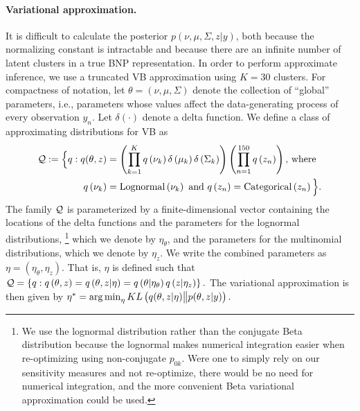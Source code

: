 %
\paragraph{Variational approximation.} It is difficult to calculate the
posterior $p\left(\nu, \mu, \Sigma, z \vert y\right)$, both because the
normalizing constant is intractable and because there are an infinite number of
latent clusters in a true BNP representation. In order to perform approximate
inference, we use a truncated VB approximation using $K=30$
clusters\citep{blei:2006:dirichletbnp}. For compactness of notation, let $\theta =
\left(\nu, \mu, \Sigma\right)$ denote the collection of ``global'' parameters,
i.e., parameters whose values affect the data-generating process of every
observation $y_n$.   Let $\delta\left(\cdot\right)$ denote a delta function. We
define a class of approximating distributions for VB as
%
\begin{align*}
\mathcal{Q} := \Big\{ q:
q(\theta, z) &=
\left(\prod_{k=1}^{K}q\left(\nu_{k}\right)\delta\left(\mu_{k}\right)
    \delta\left(\Sigma_{k}\right)\right)
    \left(\prod_{n=1}^{150}q\left(z_{n}\right) \right)\textrm{, where } \\
q\left(\nu_{k}\right) &= \mathrm{Lognormal}\left(\nu_k\right) \textrm{ and }
q\left(z_n\right) = \mathrm{Categorical}\left(z_n\right)
\Big\}.
\end{align*}
%
The family $\mathcal{Q}$ is parameterized by a finite-dimensional vector containing
the locations of the delta functions and the parameters for the lognormal
distributions,
%
\footnote{We use the lognormal distribution rather than the conjugate Beta
distribution because the lognormal makes numerical integration easier when
re-optimizing using non-conjugate $p_{0k}$.  Were one to simply rely on our
sensitivity measures and not re-optimize, there would be no need for numerical
integration, and the more convenient Beta variational approximation could be
used.}
%
which we denote by $\eta_\theta$, and the parameters for the
multinomial distributions, which we denote by $\eta_z$. We write the combined
parameters as $\eta=\left(\eta_\theta, \eta_z\right)$. That is, $\eta$ is
defined such that
%
$\mathcal{Q} =
    \left\{q: q\left(\theta, z\right) =
            q\left(\theta, z \vert \eta \right) =
            q\left(\theta \vert \eta_\theta \right)
            q\left(z \vert \eta_z \right)
    \right\}.$
%
The variational approximation is then given by
%
$
\etaopt = \argmin_{\eta} KL\left(
    q(\theta, z \vert \eta) \big\| p(\theta, z | y)
    \right). %
$

